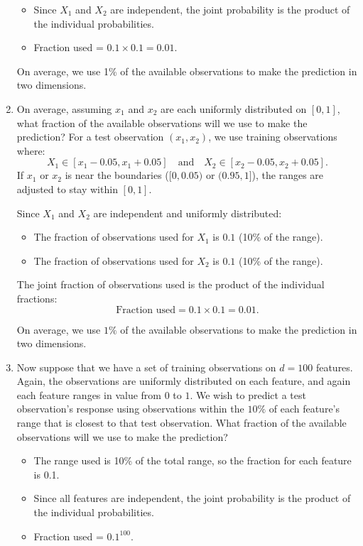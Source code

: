 \documentclass[a3paper,12pt]{extarticle} %
\begin{document}
\begin{enumerate}
\begin{itemize}
            \item Since \(X_1\) and \(X_2\) are independent, the joint probability is the product of the individual probabilities.
            \item Fraction used = \(0.1 \times 0.1 = 0.01\).
    \end{itemize}

    On average, we use 1\% of the available observations to make the prediction in two dimensions.
    
    
    \item On average, assuming $x_1$ and $x_2$ are each uniformly distributed on $[0, 1]$, what fraction of the available observations will we use to make the prediction?
    For a test observation \((x_1, x_2)\), we use training observations where:
\[
X_1 \in [x_1 - 0.05, x_1 + 0.05] \quad \text{and} \quad X_2 \in [x_2 - 0.05, x_2 + 0.05].
\]
If \(x_1\) or \(x_2\) is near the boundaries (\([0, 0.05)\) or \((0.95, 1]\)), the ranges are adjusted to stay within \([0, 1]\).


Since \(X_1\) and \(X_2\) are independent and uniformly distributed:
\begin{itemize}
    \item The fraction of observations used for \(X_1\) is \(0.1\) (10\% of the range).
    \item The fraction of observations used for \(X_2\) is \(0.1\) (10\% of the range).
\end{itemize}
The joint fraction of observations used is the product of the individual fractions:
\[
\text{Fraction used} = 0.1 \times 0.1 = 0.01.
\]


On average, we use \(1\%\) of the available observations to make the prediction in two dimensions.
    \item Now suppose that we have a set of training observations on $d = 100$ features. Again, the observations are uniformly distributed on each feature, and again each feature ranges in value from $0$ to $1$. We wish to predict a test observation’s response using observations within the $10\%$ of each feature’s range that is closest to that test observation. What fraction of the available observations will we use to make the prediction?
    \begin{itemize}
            \item The range used is 10\% of the total range, so the fraction for each feature is 0.1.
    
            \item Since all features are independent, the joint probability is the product of the individual probabilities.
            \item Fraction used = \(0.1^{100}\).
       

\end{itemize}
\end{enumerate}
\end{document}
